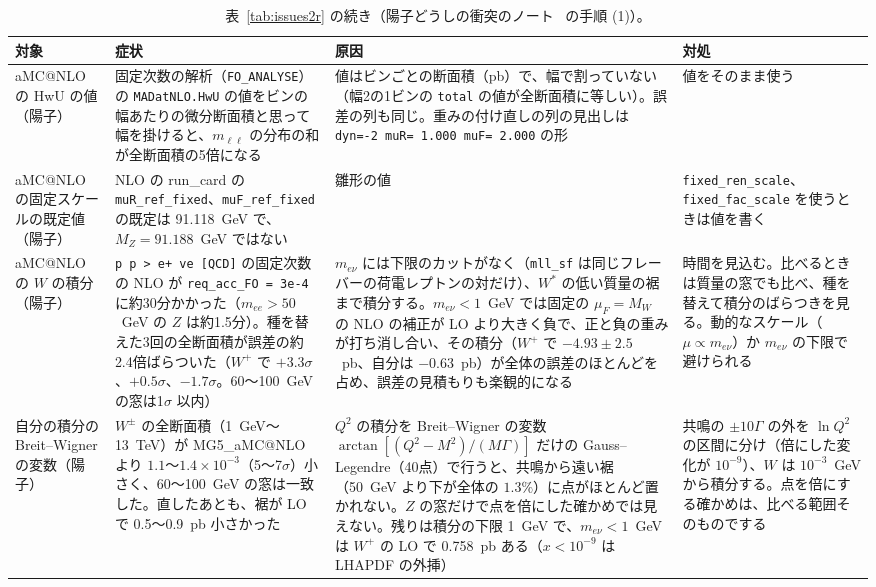 \documentclass[a4paper,10pt]{ltjsarticle}
\makeatletter
\newcommand{\MGaMC}{MG5\_aMC@NLO}
\makeatother
\begin{document}
\begin{table}[tbp]
\centering\footnotesize
\caption{表~\ref{tab:issues2r} の続き（陽子どうしの衝突のノート~\cite{ppnote} の手順 (1)）。}
\label{tab:issues2s}
\begin{tabularx}{\linewidth}{>{\raggedright\arraybackslash}p{2.4cm}>{\raggedright\arraybackslash}X>{\raggedright\arraybackslash}X>{\raggedright\arraybackslash}X}
\toprule
\textbf{対象} & \textbf{症状} & \textbf{原因} & \textbf{対処} \\
\midrule
aMC@NLO の HwU の値（陽子） & 固定次数の解析（\texttt{FO\_ANALYSE}）の \texttt{MADatNLO.HwU} の値をビンの幅あたりの微分断面積と思って幅を掛けると、$m_{\ell\ell}$ の分布の和が全断面積の5倍になる & 値はビンごとの断面積（pb）で、幅で割っていない（幅2の1ビンの \texttt{total} の値が全断面積に等しい）。誤差の列も同じ。重みの付け直しの列の見出しは \texttt{dyn=-2 muR= 1.000 muF= 2.000} の形 & 値をそのまま使う \\
aMC@NLO の固定スケールの既定値（陽子） & NLO の run\_card の \texttt{muR\_ref\_fixed}、\texttt{muF\_ref\_fixed} の既定は 91.118~GeV で、$M_Z=91.188$~GeV ではない & 雛形の値 & \texttt{fixed\_ren\_scale}、\texttt{fixed\_fac\_scale} を使うときは値を書く \\
aMC@NLO の $W$ の積分（陽子） & \texttt{p p > e+ ve [QCD]} の固定次数の NLO が \texttt{req\_acc\_FO = 3e-4} に約30分かかった（$m_{ee}>50$~GeV の $Z$ は約1.5分）。種を替えた3回の全断面積が誤差の約2.4倍ばらついた（$W^+$ で $+3.3\sigma$、$+0.5\sigma$、$-1.7\sigma$。60〜100~GeV の窓は1$\sigma$ 以内） & $m_{e\nu}$ には下限のカットがなく（\texttt{mll\_sf} は同じフレーバーの荷電レプトンの対だけ）、$W^*$ の低い質量の裾まで積分する。$m_{e\nu}<1$~GeV では固定の $\mu_F=M_W$ の NLO の補正が LO より大きく負で、正と負の重みが打ち消し合い、その積分（$W^+$ で $-4.93\pm2.5$~pb、自分は $-0.63$~pb）が全体の誤差のほとんどを占め、誤差の見積もりも楽観的になる & 時間を見込む。比べるときは質量の窓でも比べ、種を替えて積分のばらつきを見る。動的なスケール（$\mu\propto m_{e\nu}$）か $m_{e\nu}$ の下限で避けられる \\
自分の積分の Breit--Wigner の変数（陽子） & $W^\pm$ の全断面積（1~GeV〜13~TeV）が \MGaMC{} より $1.1$〜$1.4\times10^{-3}$（5〜7$\sigma$）小さく、60〜100~GeV の窓は一致した。直したあとも、裾が LO で 0.5〜0.9~pb 小さかった & $Q^2$ の積分を Breit--Wigner の変数 $\arctan[(Q^2-M^2)/(M\Gamma)]$ だけの Gauss--Legendre（40点）で行うと、共鳴から遠い裾（50~GeV より下が全体の $1.3\%$）に点がほとんど置かれない。$Z$ の窓だけで点を倍にした確かめでは見えない。残りは積分の下限 1~GeV で、$m_{e\nu}<1$~GeV は $W^+$ の LO で 0.758~pb ある（$x<10^{-9}$ は LHAPDF の外挿） & 共鳴の $\pm10\Gamma$ の外を $\ln Q^2$ の区間に分け（倍にした変化が $10^{-9}$）、$W$ は $10^{-3}$~GeV から積分する。点を倍にする確かめは、比べる範囲そのものでする \\

\end{tabularx}
\end{table}
\end{document}
